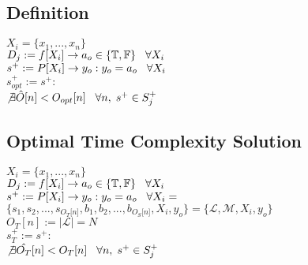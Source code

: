 \documentclass[11pt]{article}
\begin{document}
\subsection{Definition}
\begin{center}
$
X_i = \{x_1,...,x_n\}
$
\\ \vspace{2mm}
$
D_j := f \lbrack X_i \rbrack \rightarrow a_{o} \in \{\mathbb{T}, \mathbb{F}\} \hspace{3mm} \forall X_i
$
\\ \vspace{2mm}
$
s^+ := P \lbrack X_i \rbrack \rightarrow y_{o} : y_o = a_{o} \hspace{3mm} \forall X_i
$
\\ \vspace{2mm}
$
s_{opt}^+ := s^+ :
$
\\ \vspace{2mm}
$
\not \exists \hat{O} \lbrack n \rbrack < O_{opt}[n] \hspace{3mm} \forall n, \hspace{1mm}  s^+ \in S_j^+
$
\end{center}





\subsection{Optimal Time Complexity Solution}
\begin{center}
$
X_i = \{x_1,...,x_n\}
$
\\ \vspace{2mm}
$
D_j := f \lbrack X_i \rbrack \rightarrow a_{o} \in \{\mathbb{T}, \mathbb{F}\} \hspace{3mm} \forall X_i
$
\\ \vspace{2mm}
$
s^+ := P \lbrack X_i \rbrack \rightarrow y_{o} : y_o = a_{o} \hspace{3mm} \forall X_i = 
$
\\ \vspace{2mm}
$
\{ s_1,s_2,...,s_{O_T \lbrack n \rbrack }, b_1, b_2,...,b_{O_S \lbrack n \rbrack},X_i,y_o \} = \{ \mathcal{L},\mathcal{M},X_i,y_o\}
$
\\ \vspace{3mm}
$
O_T[n] := |\mathcal{L}| = N
$
\\ \vspace{2mm}
$
s_{T}^+ := s^+ :
$
\\ \vspace{2mm}
$
\not \exists \hat{O_T} \lbrack n \rbrack < O_{T}[n] \hspace{3mm} \forall n, \hspace{1mm}  s^+ \in S_j^+
$
\end{center}
\end{document}
